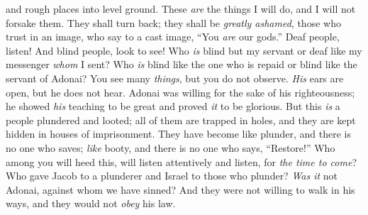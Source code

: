 \begin{biblechapter}
and rough places into level ground. 
These \textit{are} the things I will do, 
and I will not forsake them.
\verse They shall turn back; 
they shall be \textit{greatly ashamed}, 
those who trust in an image, 
who say to a cast image, “You \textit{are} our gods.”
 Deaf people, listen! 
And blind people, look to see!
\verse Who \textit{is} blind but my servant 
or deaf like my messenger \textit{whom} I sent? 
Who \textit{is} blind like the one who is repaid 
or blind like the servant of Adonai?
\verse You see many \textit{things}, but you do not observe. 
\textit{His} ears are open, but he does not hear.
\verse Adonai was willing for the sake of his righteousness; 
he showed \textit{his} teaching to be great and proved \textit{it} to be glorious.
\verse But this \textit{is} a people plundered and looted; all of them are trapped in holes, 
and they are kept hidden in houses of imprisonment. 
They have become like plunder, and there is no one who saves; 
\textit{like} booty, and there is no one who says, “Restore!”
\verse Who among you will heed this, 
will listen attentively and listen, for \textit{the time to come}?
\verse Who gave Jacob to a plunderer 
and Israel to those who plunder? \textit{Was it} not Adonai, against whom we have sinned?
\verse And they were not willing to walk in his ways, 
and they would not \textit{obey} his law.
\end{biblechapter}

